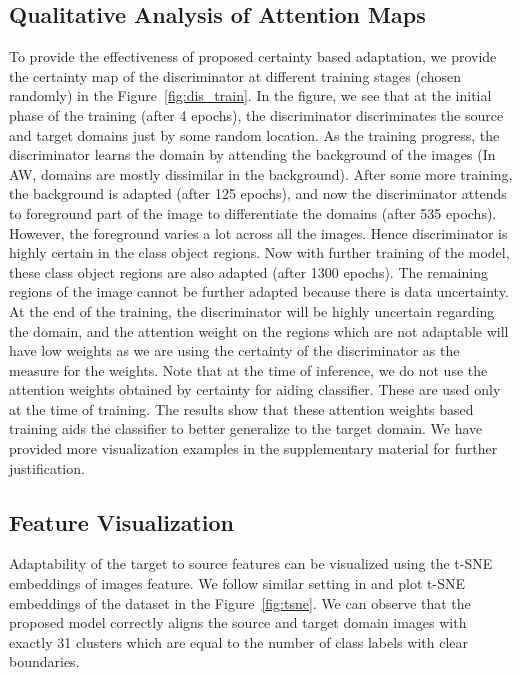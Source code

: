 \documentclass[10pt,twocolumn,letterpaper]{article}
\begin{document}
\subsection{Qualitative Analysis of Attention Maps}
\vspace{-0.1cm}
To provide the effectiveness of proposed certainty based adaptation, we provide the certainty map of the discriminator at different training stages (chosen randomly) in the Figure~\ref{fig:dis_train}. In the figure, we see that at the initial phase of the training (after 4 epochs), the discriminator discriminates the source and target domains just by some random location. As the training progress, the discriminator learns the domain by attending the background of the images (In AW, domains are mostly dissimilar in the background). After some more training, the background is adapted (after 125 epochs), and now the discriminator attends to foreground part of the image to differentiate the domains (after 535 epochs). However, the foreground varies a lot across all the images. Hence discriminator is highly certain in the class object regions. Now with further training of the model, these class object regions are also adapted (after 1300 epochs). The remaining regions of the image cannot be further adapted because there is data uncertainty.  At the end of the training, the discriminator will be highly uncertain regarding the domain, and the attention weight on the regions which are not adaptable will have low weights as we are using the certainty of the discriminator as the measure for the weights. Note that at the time of inference, we do not use the attention weights obtained by certainty for aiding classifier. These are used only at the time of training. The results show that these attention weights based training aids the classifier to better generalize to the target domain. We have provided more visualization examples in the supplementary material for further justification.
\subsection{Feature Visualization}
\vspace{-0.3em}
Adaptability of the target to source features can be visualized using the t-SNE embeddings of images feature. We follow similar setting in \cite{tzeng_arxiv2014,ganin_ICML2015,pei_arxiv2018} and plot t-SNE embeddings of the dataset in the Figure~\ref{fig:tsne}. We can observe that the proposed model correctly aligns the source and target domain images with exactly 31 clusters which are equal to the number of class labels with clear boundaries.
\end{document}
